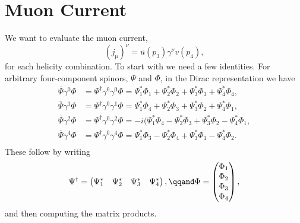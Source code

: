 \documentclass[fleqn]{NotesClass}
\newcommand{\hermit}{\dagger}
\newcommand{\diracadjoint}[1]{\overbar{#1}}
\begin{document}
    \section{Muon Current}
    We want to evaluate the muon current,
    \begin{equation}
        (j_{\text{μ}})^\nu = \diracadjoint{u}(p_3)\gamma^\nu v(p_4),
    \end{equation}
    for each helicity combination.
    To start with we need a few identities.
    For arbitrary four-component spinors, \(\Psi\) and \(\Phi\), in the Dirac representation we have
    \begin{align}
        \diracadjoint{\Psi} \gamma^0 \Phi &= \Psi^\hermit \gamma^0 \gamma^0 \Phi = \Psi_1^* \Phi_1 + \Psi_2^*\Phi_2 + \Psi_3^*\Phi_3 + \Psi_4^*\Phi_4,\\
        \diracadjoint{\Psi} \gamma^1 \Phi &= \Psi^\hermit \gamma^0 \gamma^1 \Phi = \Psi_1^* \Phi_4 + \Psi_2^*\Phi_3 + \Psi_3^*\Phi_2 + \Psi_4^*\Phi_1,\\
        \diracadjoint{\Psi} \gamma^2 \Phi &= \Psi^\hermit \gamma^0 \gamma^2 \Phi = -i(\Psi_1^* \Phi_4 - \Psi_2^*\Phi_3 + \Psi_3^*\Phi_2 - \Psi_4^*\Phi_1,\\
        \diracadjoint{\Psi} \gamma^4 \Phi &= \Psi^\hermit \gamma^0 \gamma^4 \Phi = \Psi_1^* \Phi_3 - \Psi_2^*\Phi_4 + \Psi_3^*\Phi_1 - \Psi_4^*\Phi_2.\\
    \end{align}
    These follow by writing
    \begin{equation}
        \Psi^\hermit = 
        \begin{pmatrix}
            \Psi_1^* & \Psi_2^* & \Psi_3^* & \Psi_4^*
        \end{pmatrix}
        , \qqand 
        \Phi = 
        \begin{pmatrix}
            \Phi_1\\ \Phi_2\\ \Phi_3\\ \Phi_4
        \end{pmatrix}
        ,
    \end{equation}
    and then computing the matrix products.
    
\end{document}
